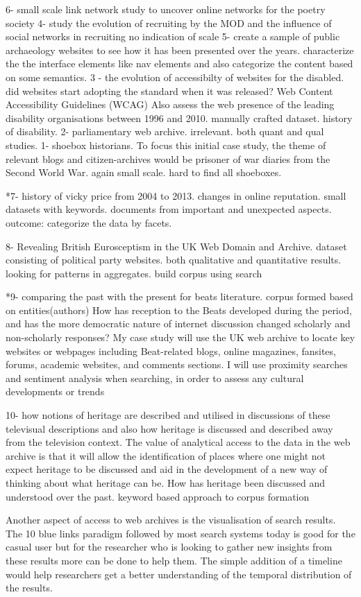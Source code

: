 

6- small scale link network study to uncover online networks for the poetry society
4- study the evolution of recruiting by the MOD and the influence of social networks in recruiting no indication of scale
5- create a sample of public archaeology websites to see how it has been presented over the years. characterize the the interface elements like nav elements and also categorize the content based on some semantics.
3 - the evolution of accessibilty of websites for the disabled. did websites start adopting the standard when it was released? Web Content Accessibility Guidelines (WCAG) Also  assess the web presence of the leading disability organisations between 1996 and 2010. manually crafted dataset. history of disability.
2- parliamentary web archive. irrelevant. both quant and qual studies.
1- shoebox historians. To focus this initial case study, the theme of relevant blogs and citizen-archives would be prisoner of war diaries from the Second World War. again small scale. hard to find all shoeboxes.


*7- history of vicky price from 2004 to 2013. changes in online reputation. small datasets with keywords. documents from important and unexpected aspects. outcome: categorize the data by facets.


8- Revealing British Eurosceptism in the UK Web Domain and Archive. dataset consisting of political party websites. both qualitative and quantitative results. looking for patterns in aggregates. build corpus using search


*9- comparing the past with the present for beats literature. corpus formed based on entities(authors) How has reception to the Beats developed during the period, and has the more democratic nature of internet discussion changed scholarly and non-scholarly responses?
My case study will use the UK web archive to locate key websites or webpages including Beat-related blogs, online magazines, fansites, forums, academic websites, and comments sections. I will use proximity searches and sentiment analysis when searching, in order to assess any cultural developments or trends




10- how notions of heritage are described and utilised in discussions of these televisual descriptions and also how heritage is discussed and described away from the television context. The value of analytical access to the data in the web archive is that it will allow the identification of places where one might not expect heritage to be discussed and aid in the development of a new way of thinking about what heritage can be. 
How has heritage been discussed and understood over the past. 
keyword based approach to corpus formation


Another aspect of access to web archives is the visualisation of search results. The 10 blue links paradigm followed by most search systems today is good for the casual user but for the researcher who is looking to gather new insights from these results more can be done to help them. The simple addition of a timeline would help researchers get a better understanding of the temporal distribution of the results.